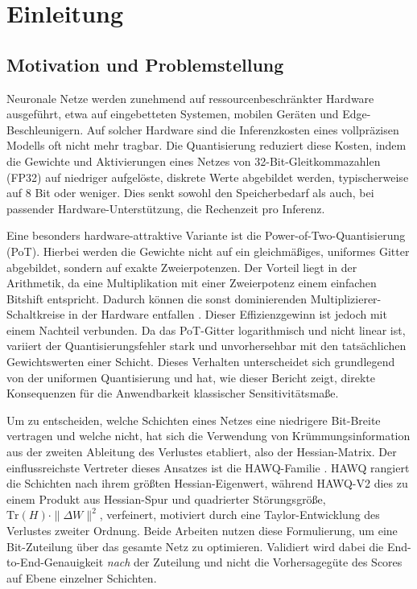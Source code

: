 \section{Einleitung}
\label{sec:introduction}

\subsection{Motivation und Problemstellung}

Neuronale Netze werden zunehmend auf ressourcenbeschränkter Hardware ausgeführt, etwa auf eingebetteten Systemen, mobilen Geräten und Edge-Beschleunigern. Auf solcher Hardware sind die Inferenzkosten eines vollpräzisen Modells oft nicht mehr tragbar. Die Quantisierung reduziert diese Kosten, indem die Gewichte und Aktivierungen eines Netzes von 32-Bit-Gleitkommazahlen (FP32) auf niedriger aufgelöste, diskrete Werte abgebildet werden, typischerweise auf 8 Bit oder weniger. Dies senkt sowohl den Speicherbedarf als auch, bei passender Hardware-Unterstützung, die Rechenzeit pro Inferenz.
\par\medskip

Eine besonders hardware-attraktive Variante ist die Power-of-Two-Quantisierung (PoT). Hierbei werden die Gewichte nicht auf ein gleichmäßiges, uniformes Gitter abgebildet, sondern auf exakte Zweierpotenzen. Der Vorteil liegt in der Arithmetik, da eine Multiplikation mit einer Zweierpotenz einem einfachen Bitshift entspricht. Dadurch können die sonst dominierenden Multiplizierer-Schaltkreise in der Hardware entfallen \citep{miyashita_pot_2016, przewlocka_rus_pot_2022}. Dieser Effizienzgewinn ist jedoch mit einem Nachteil verbunden. Da das PoT-Gitter logarithmisch und nicht linear ist, variiert der Quantisierungsfehler stark und unvorhersehbar mit den tatsächlichen Gewichtswerten einer Schicht. Dieses Verhalten unterscheidet sich grundlegend von der uniformen Quantisierung und hat, wie dieser Bericht zeigt, direkte Konsequenzen für die Anwendbarkeit klassischer Sensitivitätsmaße.
\par\medskip

Um zu entscheiden, welche Schichten eines Netzes eine niedrigere Bit-Breite vertragen und welche nicht, hat sich die Verwendung von Krümmungsinformation aus der zweiten Ableitung des Verlustes etabliert, also der Hessian-Matrix. Der einflussreichste Vertreter dieses Ansatzes ist die HAWQ-Familie \citep{dong_hawq_2019, dong_hawqv2_2020}. HAWQ rangiert die Schichten nach ihrem größten Hessian-Eigenwert, während HAWQ-V2 dies zu einem Produkt aus Hessian-Spur und quadrierter Störungsgröße, $\mathrm{Tr}(H)\cdot\|\Delta W\|^2$, verfeinert, motiviert durch eine Taylor-Entwicklung des Verlustes zweiter Ordnung. Beide Arbeiten nutzen diese Formulierung, um eine Bit-Zuteilung über das gesamte Netz zu optimieren. Validiert wird dabei die End-to-End-Genauigkeit \emph{nach} der Zuteilung und nicht die Vorhersagegüte des Scores auf Ebene einzelner Schichten.
\par\medskip

